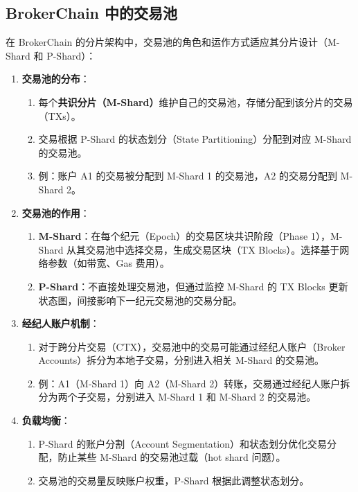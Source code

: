 \documentclass[12pt]{ctexart}
\begin{document}
\subsection{BrokerChain 中的交易池}
在 BrokerChain 的分片架构中，交易池的角色和运作方式适应其分片设计（M-Shard 和 P-Shard）：
\begin{enumerate}
    \item \textbf{交易池的分布}：
        \begin{enumerate}
            \item 每个\textbf{共识分片（M-Shard）}维护自己的交易池，存储分配到该分片的交易（TXs）。
            \item 交易根据 P-Shard 的状态划分（State Partitioning）分配到对应 M-Shard 的交易池。
            \item 例：账户 A1 的交易被分配到 M-Shard 1 的交易池，A2 的交易分配到 M-Shard 2。
        \end{enumerate}
    \item \textbf{交易池的作用}：
        \begin{enumerate}
            \item \textbf{M-Shard}：在每个纪元（Epoch）的交易区块共识阶段（Phase 1），M-Shard 从其交易池中选择交易，生成交易区块（TX Blocks）。选择基于网络参数（如带宽、Gas 费用）。
            \item \textbf{P-Shard}：不直接处理交易池，但通过监控 M-Shard 的 TX Blocks 更新状态图，间接影响下一纪元交易池的交易分配。
        \end{enumerate}
    \item \textbf{经纪人账户机制}：
        \begin{enumerate}
            \item 对于跨分片交易（CTX），交易池中的交易可能通过经纪人账户（Broker Accounts）拆分为本地子交易，分别进入相关 M-Shard 的交易池。
            \item 例：A1（M-Shard 1）向 A2（M-Shard 2）转账，交易通过经纪人账户拆分为两个子交易，分别进入 M-Shard 1 和 M-Shard 2 的交易池。
        \end{enumerate}
    \item \textbf{负载均衡}：
        \begin{enumerate}
            \item P-Shard 的账户分割（Account Segmentation）和状态划分优化交易分配，防止某些 M-Shard 的交易池过载（hot shard 问题）。
            \item 交易池的交易量反映账户权重，P-Shard 根据此调整状态划分。
        \end{enumerate}
\end{enumerate}
\end{document}
